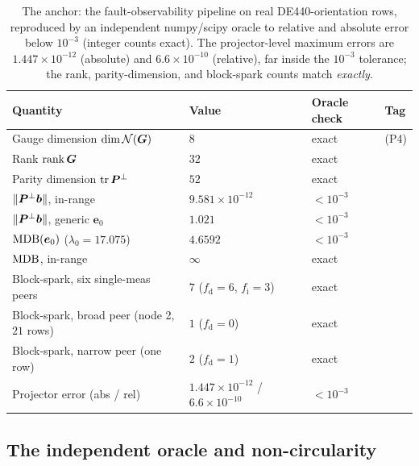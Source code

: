 \begin{table}[t]
\centering
\caption{The \Validated{} anchor: the fault-observability pipeline on real DE440-orientation
rows, reproduced by an independent numpy/scipy oracle to relative and absolute error below
$10^{-3}$ (integer counts exact). The projector-level maximum errors are $1.447\times
10^{-12}$ (absolute) and $6.6\times10^{-10}$ (relative), far inside the $10^{-3}$ tolerance;
the rank, parity-dimension, and block-spark counts match \emph{exactly}.}
\label{tab:anchor}
\footnotesize
\setlength{\tabcolsep}{6pt}
\begin{tabular}{@{}llll@{}}
\toprule
\textbf{Quantity} & \textbf{Value} & \textbf{Oracle check} & \textbf{Tag} \\
\midrule
Gauge dimension $\dim\mathcal{N}(\bm{G})$          & $8$                    & exact & \Proven{} (P4) \\
Rank $\operatorname{rank}\bm{G}$                          & $32$                   & exact & \Validated{} \\
Parity dimension $\operatorname{tr}\bm{P}^{\perp}$ & $52$                   & exact & \Validated{} \\
$\lVert\bm{P}^{\perp}\bm{b}\rVert$, in-range        & $9.581\times10^{-12}$  & $<10^{-3}$ & \Validated{} \\
$\lVert\bm{P}^{\perp}\bm{b}\rVert$, generic $\bm e_0$& $1.021$               & $<10^{-3}$ & \Validated{} \\
$\operatorname{MDB}(\bm e_0)$ ($\lambda_0=17.075$)       & $4.6592$               & $<10^{-3}$ & \Validated{} \\
$\operatorname{MDB}$, in-range                           & $\infty$               & exact & \Validated{} \\
Block-spark, six single-meas peers         & $7$ ($f_{\mathrm d}=6$, $f_{\mathrm i}=3$) & exact & \Validated{} \\
Block-spark, broad peer (node 2, $21$ rows)& $1$ ($f_{\mathrm d}=0$) & exact & \Validated{} \\
Block-spark, narrow peer (one row)         & $2$ ($f_{\mathrm d}=1$) & exact & \Validated{} \\
Projector error (abs / rel)                & $1.447\times10^{-12}$ / $6.6\times10^{-10}$ & $<10^{-3}$ & \Validated{} \\
\bottomrule
\end{tabular}
\end{table}

\subsection{The independent oracle and non-circularity}
\label{sec:oracle}

